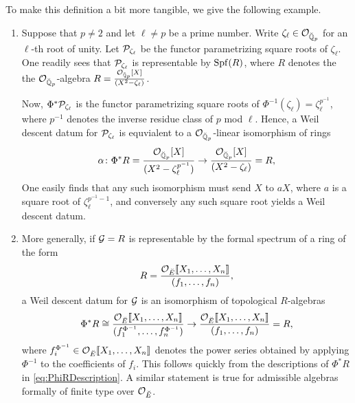 \documentclass[../main.tex]{subfiles}
\begin{document}
To make this definition a bit more tangible, we give the following example.
\begin{xpl}
  \begin{enumerate}
    \item Suppose that $p \neq 2$ and let $\ell \neq p$ be a prime number. Write 
  $\zeta_\ell \in \mathcal{O}_{{\breve {\mathbb{Q}}}_p}$ for an $\ell$-th root of unity. Let
  $\mathcal{P}_{\zeta_\ell}$ be the functor parametrizing
  square roots of $\zeta_\ell$. One readily sees that $\mathcal{P}_{\zeta_\ell}$ is
  representable by 
  $\operatorname{Spf}(R)$, where $R$ denotes the the $\mathcal{O}_{{\breve {\mathbb{Q}}}_p}$-algebra
  $R = \frac{\mathcal{O}_{{\breve {\mathbb{Q}}}_p}[X]}{(X^2 - \zeta_\ell)}$. 

  Now, $\Phi^*\mathcal{P}_{\zeta_\ell}$ is the functor
  parametrizing square roots of $\Phi^{-1}(\zeta_\ell) = \zeta_\ell^{p^{-1}}$,
  where $p^{-1}$ denotes the inverse residue class of $p$ mod $\ell$. 
  Hence, a Weil descent datum for $\mathcal{P}_{\zeta_\ell}$ is equvialent to a 
  $\mathcal{O}_{{\breve {\mathbb{Q}}}_p}$-linear isomorphism of rings
  \begin{equation*}
    \alpha \colon \Phi^* R = \frac{\mathcal{O}_{{\breve {\mathbb{Q}}}_p}[X]}{(X^2 - \zeta_\ell^{p^{-1}})} \to
    \frac{\mathcal{O}_{{\breve {\mathbb{Q}}}_p}[X]}{(X^2 - \zeta_\ell)} = R, 
  \end{equation*}
  One easily finds that any such isomorphism must send $X$ to $aX$, where $a$
  is a square root of $\zeta_\ell^{p^{-1}-1}$, and conversely any such square
  root yields a Weil descent datum.
    \item More generally, if $\mathcal{G} = R$ is representable by the formal spectrum of a 
      ring of the form
      \begin{equation*}
        R = \frac{ \mathcal{O}_{{\breve {E}}}\llbracket X_1, \dots, X_n \rrbracket}{(f_1, \dots,
        f_n)},
      \end{equation*} a Weil descent datum 
      for $\mathcal{G}$ is an isomorphism of topological $R$-algebras
      \begin{equation*}
        \Phi^* R \cong \frac{ \mathcal{O}_{{\breve {E}}} \llbracket X_1, \dots, X_n \rrbracket}{(f_1^{\Phi^{-1}},
        \dots, f_n^{\Phi^{-1}})}
        \to 
        \frac{ \mathcal{O}_{{\breve {E}}}\llbracket X_1, \dots, X_n \rrbracket}{(f_1, \dots,
        f_n)} = R,
      \end{equation*}
      where $f_i^{\Phi^{-1}} \in \mathcal{O}_{\breve {E}}\llbracket X_1, \dots, X_n\rrbracket$ denotes the 
      power series obtained by applying $\Phi^{-1}$ to the coefficients of $f_i$.
      This follows quickly from the descriptions of $\Phi^*R$ in
      \eqref{eq:PhiRDescription}. A similar statement is true for admissible algebras
      formally of finite type over $\mathcal{O}_{\breve {E}}$.
  \end{enumerate}
\end{xpl}
\end{document}
